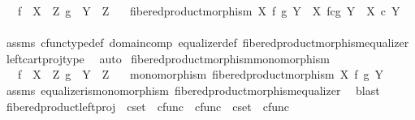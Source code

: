 \begin{isabellebody}
\ \ \ {\isachardoublequoteopen}f\ {\isacharcolon}{\kern0pt}\ X\ {\isasymrightarrow}\ Z{\isachardoublequoteclose}\ {\isachardoublequoteopen}g\ {\isacharcolon}{\kern0pt}\ Y\ {\isasymrightarrow}\ Z{\isachardoublequoteclose}\isanewline
\ \ \ {\isachardoublequoteopen}fibered{\isacharunderscore}{\kern0pt}product{\isacharunderscore}{\kern0pt}morphism\ X\ f\ g\ Y\ {\isacharcolon}{\kern0pt}\ X\ \isactrlbsub f\isactrlesub {\isasymtimes}\isactrlsub c\isactrlbsub g\isactrlesub \ Y\ {\isasymrightarrow}\ X\ {\isasymtimes}\isactrlsub c\ Y{\isachardoublequoteclose}\isanewline
%
\isadelimproof
\ \ %
\endisadelimproof
%
\isatagproof
{}\isamarkupfalse%
\ assms\ cfunc{\isacharunderscore}{\kern0pt}type{\isacharunderscore}{\kern0pt}def\ domain{\isacharunderscore}{\kern0pt}comp\ equalizer{\isacharunderscore}{\kern0pt}def\ fibered{\isacharunderscore}{\kern0pt}product{\isacharunderscore}{\kern0pt}morphism{\isacharunderscore}{\kern0pt}equalizer\ left{\isacharunderscore}{\kern0pt}cart{\isacharunderscore}{\kern0pt}proj{\isacharunderscore}{\kern0pt}type\ \isamarkupfalse%
\ auto%
\endisatagproof
{\isafoldproof}%
%
\isadelimproof
\isanewline
%
\endisadelimproof
\isanewline
{}\isamarkupfalse%
\ fibered{\isacharunderscore}{\kern0pt}product{\isacharunderscore}{\kern0pt}morphism{\isacharunderscore}{\kern0pt}monomorphism{\isacharcolon}{\kern0pt}\isanewline
\ \ \ {\isachardoublequoteopen}f\ {\isacharcolon}{\kern0pt}\ X\ {\isasymrightarrow}\ Z{\isachardoublequoteclose}\ {\isachardoublequoteopen}g\ {\isacharcolon}{\kern0pt}\ Y\ {\isasymrightarrow}\ Z{\isachardoublequoteclose}\isanewline
\ \ \ {\isachardoublequoteopen}monomorphism\ {\isacharparenleft}{\kern0pt}fibered{\isacharunderscore}{\kern0pt}product{\isacharunderscore}{\kern0pt}morphism\ X\ f\ g\ Y{\isacharparenright}{\kern0pt}{\isachardoublequoteclose}\isanewline
%
\isadelimproof
\ \ %
\endisadelimproof
%
\isatagproof
{}\isamarkupfalse%
\ assms\ equalizer{\isacharunderscore}{\kern0pt}is{\isacharunderscore}{\kern0pt}monomorphism\ fibered{\isacharunderscore}{\kern0pt}product{\isacharunderscore}{\kern0pt}morphism{\isacharunderscore}{\kern0pt}equalizer\ \isamarkupfalse%
\ blast%
\endisatagproof
{\isafoldproof}%
%
\isadelimproof
\isanewline
%
\endisadelimproof
\isanewline
{}\isamarkupfalse%
\ fibered{\isacharunderscore}{\kern0pt}product{\isacharunderscore}{\kern0pt}left{\isacharunderscore}{\kern0pt}proj\ {\isacharcolon}{\kern0pt}{\isacharcolon}{\kern0pt}\ {\isachardoublequoteopen}cset\ {\isasymRightarrow}\ cfunc\ {\isasymRightarrow}\ cfunc\ {\isasymRightarrow}\ cset\ {\isasymRightarrow}\ cfunc{\isachardoublequoteclose}\ \isanewline

\end{isabellebody}
